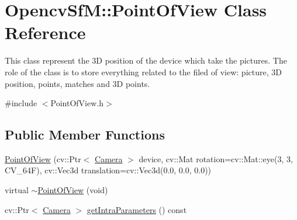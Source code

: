 \hypertarget{class_opencv_sf_m_1_1_point_of_view}{
\section{OpencvSfM::PointOfView Class Reference}
\label{class_opencv_sf_m_1_1_point_of_view}
}


This class represent the 3D position of the device which take the pictures. The role of the class is to store everything related to the filed of view: picture, 3D position, points, matches and 3D points.  




{\ttfamily \#include $<$PointOfView.h$>$}

\subsection*{Public Member Functions}
\begin{DoxyCompactItemize}
\item 
\hyperlink{class_opencv_sf_m_1_1_point_of_view_a296c28b5a2c8412a62ae3a7752a2c850}{PointOfView} (cv::Ptr$<$ \hyperlink{class_opencv_sf_m_1_1_camera}{Camera} $>$ device, cv::Mat rotation=cv::Mat::eye(3, 3, CV\_\-64F), cv::Vec3d translation=cv::Vec3d(0.0, 0.0, 0.0))
\item 
virtual \hyperlink{class_opencv_sf_m_1_1_point_of_view_aff68fe7602ebc6effa817860cea983f7}{$\sim$PointOfView} (void)
\item 
cv::Ptr$<$ \hyperlink{class_opencv_sf_m_1_1_camera}{Camera} $>$ \hyperlink{class_opencv_sf_m_1_1_point_of_view_ae5de2e16eac553ea1e1e7501e009bbbd}{getIntraParameters} () const 
\end{DoxyCompactItemize}
